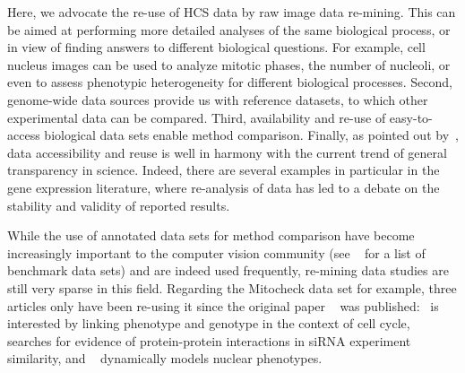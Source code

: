 Here, we advocate the re-use of HCS data by raw image data re-mining. This can be aimed at performing more detailed analyses of the same biological process, or in view of finding answers to different biological questions. For example, cell nucleus images can be used to analyze mitotic phases, the number of nucleoli, or even to assess phenotypic heterogeneity for different biological processes. Second,
genome-wide data sources provide us with reference datasets, to which other experimental data can be compared. Third, availability and re-use of easy-to-access biological data sets enable method
comparison. Finally, as pointed out by~\cite{pmid24904347}, data accessibility and reuse is well
in harmony with the current trend of general transparency in science. Indeed, there are several examples in particular in the gene expression literature, where re-analysis of data has led to a debate on the stability and validity of reported results. 

While the use of annotated data sets for method comparison have become
increasingly important to the computer vision community
(see ~\cite{pmid24904347} for a list of benchmark data sets) and are
indeed used frequently, re-mining data studies are still very sparse in this field. Regarding the Mitocheck data set for example, three articles only have been re-using it since the original paper ~\cite{pmid20360735} was published:~\cite{ostaszewski2012evolutionary} is interested by linking phenotype and genotype in the context of cell cycle,~\cite{pmid25255318} searches for evidence of
protein-protein interactions in siRNA experiment similarity, and ~\cite{pmid24131777} dynamically models nuclear phenotypes. 

